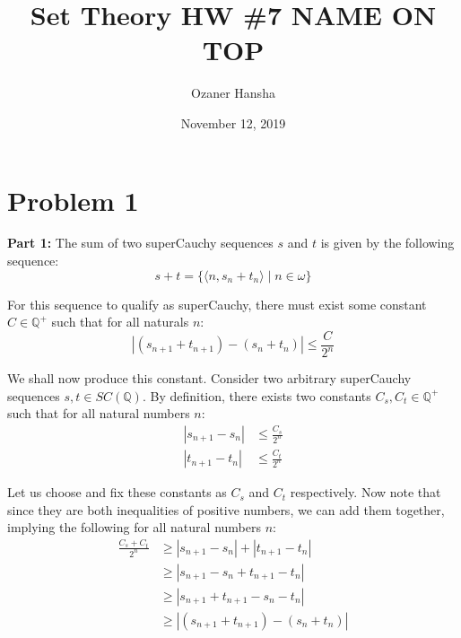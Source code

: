 \documentclass{article}
\begin{document}
\title{Set Theory HW \#7 NAME ON TOP}
\author{Ozaner Hansha}
\date{November 12, 2019}
\maketitle

\newcommand{\pset}[1]{\mathfrak P#1}
\newcommand{\psetp}[1]{\mathfrak P(#1)}
\renewcommand{\wedge}{\,\,\&\,\,}
\renewcommand{\vee}{\text{ or }}
\newcommand{\pair}[2]{\langle#1,#2\rangle}
\newcommand{\triplet}[3]{\langle#1,#2,#3\rangle}
\renewcommand{\setminus}{-}


\section*{Problem 1}
\noindent\textbf{Part 1:} The sum of two superCauchy sequences $s$ and $t$ is given by the following sequence:
\begin{equation*}
    s+t=\{\pair{n}{s_n+t_n}\mid n\in\omega\}
\end{equation*}

For this sequence to qualify as superCauchy, there must exist some constant $C\in\mathbb Q^+$ such that for all naturals $n$:
\begin{equation*}
    |(s_{n+1}+t_{n+1})-(s_n+t_n)|\le\frac{C}{2^n}
\end{equation*}

We shall now produce this constant. Consider two arbitrary superCauchy sequences $s,t\in SC(\mathbb Q)$. By definition, there exists two constants $C_s,C_t\in\mathbb Q^+$ such that for all natural numbers $n$:
\begin{align}
    |s_{n+1}-s_n|&\le\frac{C_s}{2^n}\\
    |t_{n+1}-t_n|&\le\frac{C_t}{2^n}
\end{align}

Let us choose and fix these constants as $C_s$ and $C_t$ respectively. Now note that since they are both inequalities of positive numbers, we can add them together, implying the following for all natural numbers $n$:
\begin{align*}
    \frac{C_s+C_t}{2^n}&\ge|s_{n+1}-s_n|+|t_{n+1}-t_n|\tag{sum of (1) and (2)}\\
    &\ge|s_{n+1}-s_n+t_{n+1}-t_n|\tag{triangle inequality}\\
    &\ge|s_{n+1}+t_{n+1}-s_n-t_n|\tag{associative \& commutative prop. of $\mathbb Q$}\\
    &\ge|(s_{n+1}+t_{n+1})-(s_n+t_n)|\tag{distributive prop. of $\mathbb Q$}
\end{align*}
\end{document}
